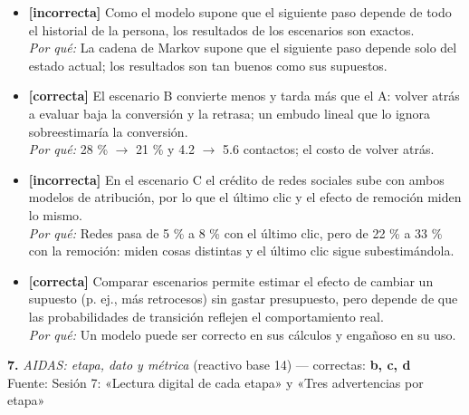 \documentclass[10pt,letterpaper]{article}
\begin{document}
\begin{itemize}[leftmargin=1.2em,itemsep=0pt,topsep=1pt,parsep=0pt]
\item[\textbf{a)}] {\footnotesize \textbf{[incorrecta]} Como el modelo supone que el siguiente paso depende de todo el historial de la persona, los resultados de los escenarios son exactos.\\ \textit{Por qué:} La cadena de Markov supone que el siguiente paso depende solo del estado actual; los resultados son tan buenos como sus supuestos.}
\item[\textbf{b)}] {\footnotesize \textbf{[correcta]} El escenario B convierte menos y tarda más que el A: volver atrás a evaluar baja la conversión y la retrasa; un embudo lineal que lo ignora sobreestimaría la conversión.\\ \textit{Por qué:} 28 \% $\to$ 21 \% y 4.2 $\to$ 5.6 contactos; el costo de volver atrás.}
\item[\textbf{c)}] {\footnotesize \textbf{[incorrecta]} En el escenario C el crédito de redes sociales sube con ambos modelos de atribución, por lo que el último clic y el efecto de remoción miden lo mismo.\\ \textit{Por qué:} Redes pasa de 5 \% a 8 \% con el último clic, pero de 22 \% a 33 \% con la remoción: miden cosas distintas y el último clic sigue subestimándola.}
\item[\textbf{d)}] {\footnotesize \textbf{[correcta]} Comparar escenarios permite estimar el efecto de cambiar un supuesto (p. ej., más retrocesos) sin gastar presupuesto, pero depende de que las probabilidades de transición reflejen el comportamiento real.\\ \textit{Por qué:} Un modelo puede ser correcto en sus cálculos y engañoso en su uso.}
\end{itemize}
\vspace{3pt}\noindent\textbf{7.} \textit{AIDAS: etapa, dato y métrica} (reactivo base 14) — correctas: \textbf{b, c, d}\\[-1pt]
{\scriptsize Fuente: Sesión 7: «Lectura digital de cada etapa» y «Tres advertencias por etapa»}
\end{document}
